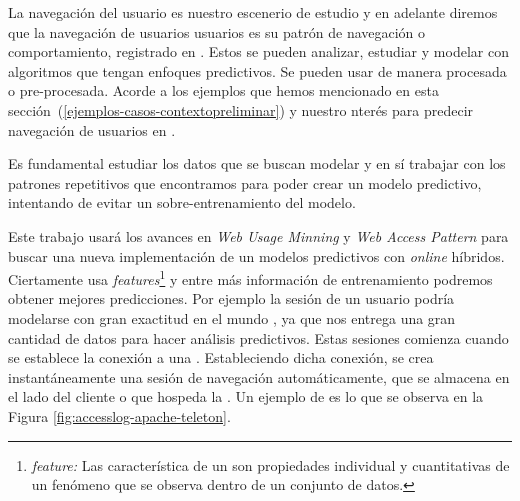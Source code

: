 	

La navegación del usuario es nuestro escenerio de estudio y en adelante diremos que la  navegación de usuarios usuarios es su patrón de navegación o comportamiento, registrado en \webasccesslog. Estos se pueden analizar, estudiar y modelar con algoritmos que tengan enfoques predictivos. Se pueden usar de manera procesada o pre-procesada. Acorde a los ejemplos que hemos mencionado en esta sección~(\ref{ejemplos-casos-contextopreliminar})  y nuestro nterés para predecir navegación de usuarios en \www.






 Es fundamental estudiar los datos que se buscan modelar y en sí trabajar con los patrones repetitivos que encontramos para poder crear un modelo predictivo, intentando de evitar un sobre-entrenamiento del modelo. 



 Este trabajo usará los avances en \emph{Web Usage Minning} y \emph{Web Access Pattern} para buscar una nueva implementación de un modelos predictivos con  \emph{online} híbridos. Ciertamente \machinelearning usa \emph{features}\footnote{\emph{feature:} Las característica de un \machinelearning son propiedades individual y cuantitativas de un fenómeno que se observa dentro de un conjunto de datos.} y entre más información de entrenamiento podremos  obtener mejores predicciones. Por ejemplo la sesión de un usuario podría modelarse con gran exactitud en el mundo \machinelearning, ya que nos entrega una gran cantidad de datos para hacer análisis predictivos. Estas sesiones comienza cuando se establece la conexión a una \www. Estableciendo dicha conexión, se crea instantáneamente una sesión de navegación automáticamente, que se almacena en el lado del cliente o que hospeda la \www. Un ejemplo de \webasccesslog es lo que se observa en la Figura \ref{fig:accesslog-apache-teleton}.

